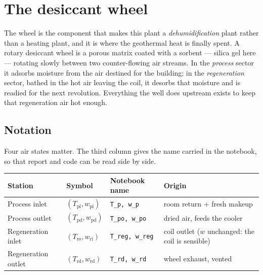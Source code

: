 \section{The desiccant wheel}
\label{sec:dw:main}

The wheel is the component that makes this plant a \emph{dehumidification}
plant rather than a heating plant, and it is where the geothermal heat is
finally spent. A rotary desiccant wheel is a porous matrix coated with a
sorbent --- silica gel here --- rotating slowly between two counter-flowing
air streams. In the \emph{process} sector it adsorbs moisture from the air
destined for the building; in the \emph{regeneration} sector, bathed in the
hot air leaving the coil, it desorbs that moisture and is readied for the
next revolution. Everything the well does upstream exists to keep that
regeneration air hot enough.

\subsection{Notation}
\label{sec:dw:notation}

Four air states matter. The third column gives the name carried in the
notebook, so that report and code can be read side by side.

\begin{center}
\begin{tabular}{@{}llll@{}}
\toprule
Station & Symbol & Notebook name & Origin \\
\midrule
Process inlet      & $(T_{\mathrm{pi}},w_{\mathrm{pi}})$ & \texttt{T\_p, w\_p}     & room return + fresh makeup \\
Process outlet     & $(T_{\mathrm{pd}},w_{\mathrm{pd}})$ & \texttt{T\_po, w\_po}   & dried air, feeds the cooler \\
Regeneration inlet & $(T_{\mathrm{ro}},w_{\mathrm{ri}})$ & \texttt{T\_reg, w\_reg} & coil outlet ($w$ unchanged: the coil is sensible) \\
Regeneration outlet& $(T_{\mathrm{rd}},w_{\mathrm{rd}})$ & \texttt{T\_rd, w\_rd}   & wheel exhaust, vented \\
\bottomrule
\end{tabular}
\end{center}

